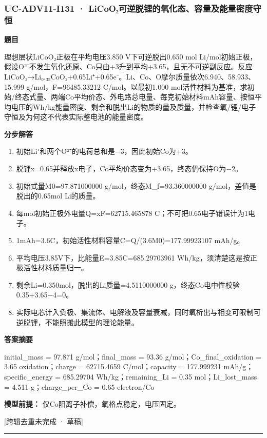 \documentclass[UTF8,11pt,a4paper]{ctexart}
\begin{document}
\subsubsection*{UC-ADV11-I131 · LiCoO₂可逆脱锂的氧化态、容量及能量密度守恒}
\noindent\textbf{题目}\par
理想层状LiCoO₂正极在平均电压3.850 V下可逆脱出0.650 mol Li/mol初始正极，假设O²⁻不发生氧化还原、Co只由+3升到平均+3.65，且无不可逆副反应。反应LiCoO₂→Li₀.₃₅CoO₂+0.65Li⁺+0.65e⁻。Li、Co、O摩尔质量依次6.940、58.933、15.999 g/mol，F=96485.33212 C/mol。以最初1.000 mol活性材料为基准，求初始/终态式量、两端Co平均价态、外电路总电量、每克初始材料mAh容量、按恒平均电压的Wh/kg能量密度、剩余和脱出Li的物质的量及质量，并检查氧/锂/电子守恒及为何这不代表实际整电池的能量密度。\par
\medskip\noindent\textbf{分步解答}
\begin{enumerate}
\item 初始Li⁺和两个O²⁻的电荷总和是−3，因此初始Co为+3。
\item 脱锂x=0.65并释放x电子，Co平均价态变为+3.65，终态仍保持O为−2。
\item 初始式量M0=97.871000000 g/mol，终态M\_f=93.360000000 g/mol，差值是脱出的0.65mol Li的质量。
\item 每mol初始正极外电量Q=xF=62715.465878 C；不可把0.65电子错误计为1电子。
\item 1mAh=3.6C，初始活性材料容量C=Q/(3.6M0)=177.99923107 mAh/g。
\item 平均电压3.85V下，比能量E=3.85C=685.29703961 Wh/kg，须清楚这是按正极活性材料质量归一。
\item 剩余Li=0.350mol，脱出的Li质量=4.5110000000 g，终态Co电中性校验0.35+3.65−4=0。
\item 实际电芯计入负极、集流体、电解液及容量衰减，同时氧析出与相变可限制可逆脱锂，不能照搬此模型的理论能量。
\end{enumerate}
\noindent\textbf{答案摘要}\par
initial\_mass = 97.871 g/mol；final\_mass = 93.36 g/mol；Co\_final\_oxidation = 3.65 oxidation；charge = 62715.4659 C/mol；capacity = 177.999231 mAh/g；specific\_energy = 685.29704 Wh/kg；remaining\_Li = 0.35 mol；Li\_lost\_mass = 4.511 g；charge\_per\_Co = 0.65 electron/Co\par
\noindent\textbf{模型前提：}
仅Co阳离子补偿，氧格点稳定，电压固定。\par
\noindent\textcolor{red!65!black}{[跨辑去重未完成 · 草稿]} \par
\medskip\hrule\medskip
{}
\end{document}
